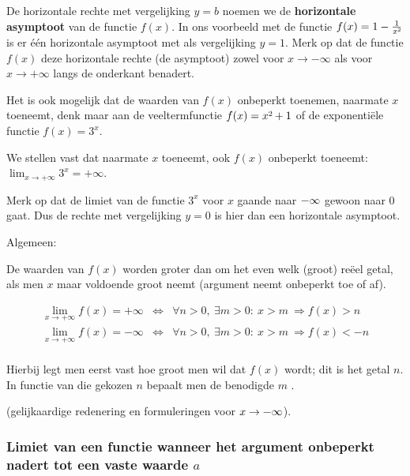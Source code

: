 De horizontale rechte met vergelijking $y=b$ noemen we de \textbf{horizontale
asymptoot} van de functie $f(x)$. In ons voorbeeld met de functie
$f(x)= 1-\frac{1}{x\text{\texttwosuperior}}$ is er
\'e\'en horizontale asymptoot met als vergelijking $y=1$. Merk op dat
de functie $f(x)$ deze horizontale rechte (de asymptoot) zowel voor
$x\rightarrow-\infty$ als voor $x\rightarrow+\infty$ langs de onderkant
benadert.

Het is ook mogelijk dat de waarden van $f(x)$ onbeperkt
toenemen, naarmate $x$ toeneemt, denk maar aan de veeltermfunctie
$f(x)=x\text{\texttwosuperior}+1$ of de exponenti\"ele functie $f(x)=3^{x}$.

We stellen vast dat naarmate $x$ toeneemt, ook $f(x)$
onbeperkt toeneemt: $ \lim_{x\to+\infty}3^{x}=+\infty$. 

Merk op dat de limiet van de functie $3^{x}$ voor $x$
gaande naar $\text{\textminus\ensuremath{\infty}}$ gewoon naar $0$
gaat. Dus de rechte met vergelijking $y=0$ is hier dan een horizontale
asymptoot.


\begin{figure}[H]
	\centering
	
\end{figure}

Algemeen:

De waarden van $f(x)$ worden groter dan om het even welk (groot)
re\"eel getal, als men $x$ maar voldoende groot neemt (argument neemt
onbeperkt toe of af).

\begin{eqnarray*}
 \lim_{x\to+\infty}f(x)=+\infty & \Leftrightarrow & \forall n>0,\:\exists m>0:\:x>m\:\Rightarrow f(x)>n\\
 \lim_{x\to+\infty}f(x)=-\infty & \Leftrightarrow & \forall n>0,\:\exists m>0:\:x>m\:\Rightarrow f(x)<-n\\
\end{eqnarray*} 

Hierbij legt men eerst vast hoe groot men wil dat $f(x)$ wordt; dit
is het getal $n$. In functie van die gekozen $n$ bepaalt men de
benodigde $m$ .

(gelijkaardige redenering en formuleringen voor $x\rightarrow\text{\textminus\ensuremath{\infty}}$).


\subsubsection{Limiet van een functie wanneer het argument onbeperkt nadert tot
een vaste waarde $a$}

